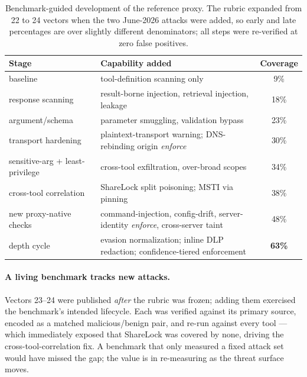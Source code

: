 \documentclass[11pt]{article}
\begin{document}
\begin{table}[h]
\centering
\caption{Benchmark-guided development of the reference proxy. The rubric expanded from 22 to 24 vectors when the two June-2026 attacks were added, so early and late percentages are over slightly different denominators; all steps were re-verified at zero false positives.}
\label{tab:arc}
\small
\begin{tabularx}{\linewidth}{@{}lXc@{}}
\toprule
Stage & Capability added & Coverage \\
\midrule
baseline & tool-definition scanning only & 9\% \\
response scanning & result-borne injection, retrieval injection, leakage & 18\% \\
argument/schema & parameter smuggling, validation bypass & 23\% \\
transport hardening & plaintext-transport warning; DNS-rebinding origin \emph{enforce} & 30\% \\
sensitive-arg + least-privilege & cross-tool exfiltration, over-broad scopes & 34\% \\
cross-tool correlation & ShareLock split poisoning; MSTI via pinning & 38\% \\
new proxy-native checks & command-injection, config-drift, server-identity \emph{enforce}, cross-server taint & 48\% \\
depth cycle & evasion normalization; inline DLP redaction; confidence-tiered enforcement & \textbf{63\%} \\
\bottomrule
\end{tabularx}
\end{table}

\paragraph{A living benchmark tracks new attacks.} Vectors 23--24 were published \emph{after} the rubric was frozen; adding them exercised the benchmark's intended lifecycle. Each was verified against its primary source, encoded as a matched malicious/benign pair, and re-run against every tool --- which immediately exposed that ShareLock was covered by none, driving the cross-tool-correlation fix. A benchmark that only measured a fixed attack set would have missed the gap; the value is in re-measuring as the threat surface moves.
\end{document}
